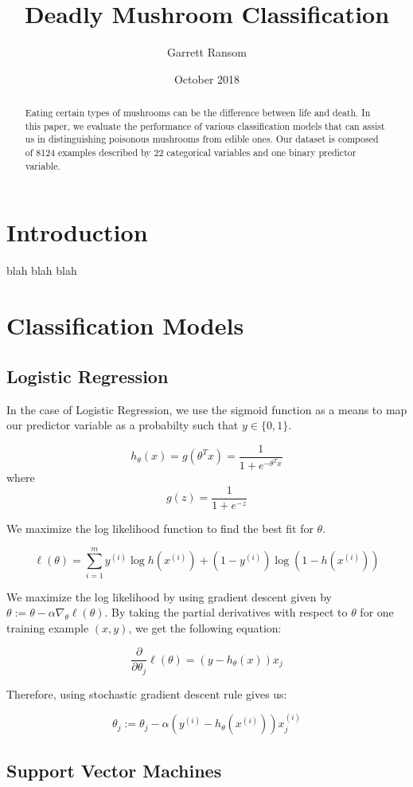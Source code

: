 \documentclass[11pt, letterpaper]{article}
\title{Deadly Mushroom Classification}
\author{Garrett Ransom}
\date{October 2018}
\begin{document}
	\maketitle
	\begin{abstract}
		\noindent
		Eating certain types of mushrooms can be the difference between life and death. In this paper, we evaluate the performance of various classification models that can assist us in distinguishing poisonous mushrooms from edible ones. Our dataset is composed of 8124 examples described by 22 categorical variables and one binary predictor variable.
	\end{abstract}

\section{Introduction}
blah blah blah


\section{Classification Models}

\subsection{Logistic Regression}
In the case of Logistic Regression, we use the sigmoid function as a means to map our predictor variable as a probabilty such that $y \in \{0, 1\}$. 

$$h_\theta(x) = g(\theta^Tx) = \frac{1}{1 + e^{-\theta^Tx}}$$ where
$$g(z) = \frac{1}{1 + e^{-z}}$$

We maximize the log likelihood function to find the best fit for $\theta$.

$$\ell(\theta) = \sum_{i=1}^{m} y^{(i)}\log h(x^{(i)}) + (1-y^{(i)})\log(1 - h(x^{(i)})) $$

We maximize the log likelihood by using gradient descent given by $\theta := \theta - \alpha\nabla_\theta \ell(\theta)$. By taking the partial derivatives with respect to $\theta$ for one training example $(x,y)$, we get the following equation:

$$\frac{\partial}{\partial \theta_j} \ell(\theta) = (y - h_\theta(x))x_j$$

Therefore, using stochastic gradient descent rule gives us:

$$ \theta_j := \theta_j - \alpha(y^{(i)} - h_\theta(x^{(i)} )) x^{(i)}_j $$

\subsection{Support Vector Machines}
\end{document}
